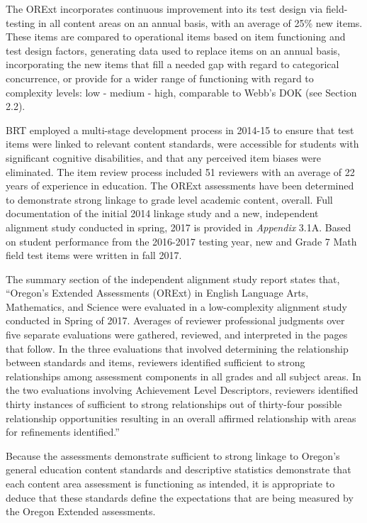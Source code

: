 \documentclass[]{article}
\begin{document}
The ORExt incorporates continuous improvement into its test design via
field-testing in all content areas on an annual basis, with an average
of 25\% new items. These items are compared to operational items based
on item functioning and test design factors, generating data used to
replace items on an annual basis, incorporating the new items that fill
a needed gap with regard to categorical concurrence, or provide for a
wider range of functioning with regard to complexity levels: low -
medium - high, comparable to Webb's DOK (see Section 2.2).

BRT employed a multi-stage development process in 2014-15 to ensure that
test items were linked to relevant content standards, were accessible
for students with significant cognitive disabilities, and that any
perceived item biases were eliminated. The item review process included
51 reviewers with an average of 22 years of experience in education. The
ORExt assessments have been determined to demonstrate strong linkage to
grade level academic content, overall. Full documentation of the initial
2014 linkage study and a new, independent alignment study conducted in
spring, 2017 is provided in \emph{Appendix} 3.1A. Based on student
performance from the 2016-2017 testing year, new and Grade 7 Math field
test items were written in fall 2017.

The summary section of the independent alignment study report states
that, ``Oregon's Extended Assessments (ORExt) in English Language Arts,
Mathematics, and Science were evaluated in a low-complexity alignment
study conducted in Spring of 2017. Averages of reviewer professional
judgments over five separate evaluations were gathered, reviewed, and
interpreted in the pages that follow. In the three evaluations that
involved determining the relationship between standards and items,
reviewers identified sufficient to strong relationships among assessment
components in all grades and all subject areas. In the two evaluations
involving Achievement Level Descriptors, reviewers identified thirty
instances of sufficient to strong relationships out of thirty-four
possible relationship opportunities resulting in an overall affirmed
relationship with areas for refinements identified.''

Because the assessments demonstrate sufficient to strong linkage to
Oregon's general education content standards and descriptive statistics
demonstrate that each content area assessment is functioning as
intended, it is appropriate to deduce that these standards define the
expectations that are being measured by the Oregon Extended assessments.
\end{document}
